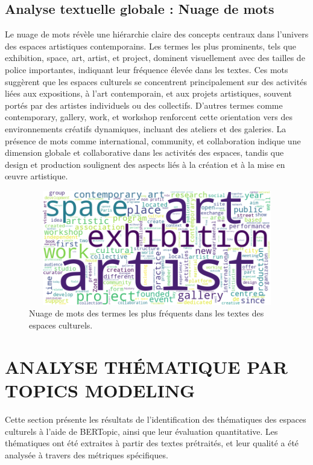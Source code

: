 \documentclass[mstat,12pt]{unswthesis}
\begin{document}
\bigskip

\subsection{Analyse textuelle globale : Nuage de mots }

\bigskip

Le nuage de mots révèle une hiérarchie claire des concepts centraux dans l'univers des 
espaces artistiques contemporains. Les termes les plus prominents, tels que exhibition, space, 
art, artist, et project, dominent visuellement avec des tailles de police importantes, indiquant 
leur fréquence élevée dans les textes. Ces mots suggèrent que les espaces culturels se 
concentrent principalement sur des activités liées aux expositions, à l’art contemporain, et aux 
projets artistiques, souvent portés par des artistes individuels ou des collectifs. D’autres 
termes comme contemporary, gallery, work, et workshop renforcent cette orientation vers 
des environnements créatifs dynamiques, incluant des ateliers et des galeries. La présence de 
mots comme international, community, et collaboration indique une dimension globale et 
collaborative dans les activités des espaces, tandis que design et production soulignent des 
aspects liés à la création et à la mise en œuvre artistique.



\begin{figure}[H]
    \centering
    \includegraphics[width=13cm,height=5cm]{word_cloud.png}
    \caption{Nuage de mots des termes les plus fréquents dans les textes des espaces culturels.}
    \label{fig:enquete}
\end{figure}

\section{ANALYSE THÉMATIQUE PAR TOPICS MODELING}

Cette section présente les résultats de l’identification des thématiques des espaces culturels à 
l’aide de BERTopic, ainsi que leur évaluation quantitative. Les thématiques ont été extraites à 
partir des textes prétraités, et leur qualité a été analysée à travers des métriques spécifiques. 
\end{document}
